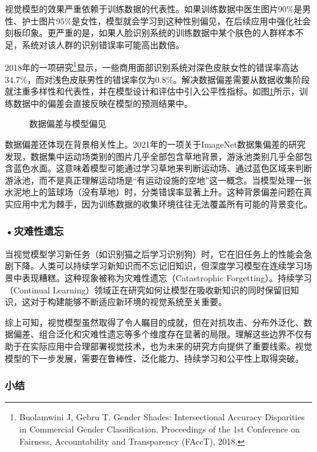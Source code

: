 视觉模型的效果严重依赖于训练数据的代表性。如果训练数据中医生图片90\%是男性、护士图片95\%是女性，模型就会学习到这种性别偏见，在后续应用中强化社会刻板印象。更严重的是，如果人脸识别系统的训练数据中某个肤色的人群样本不足，系统对该人群的识别错误率可能高出数倍。

2018年的一项研究\footnote{Buolamwini J, Gebru T. Gender Shades: Intersectional Accuracy Disparities in Commercial Gender Classification. Proceedings of the 1st Conference on Fairness, Accountability and Transparency (FAccT), 2018.}显示，一些商用面部识别系统对深色皮肤女性的错误率高达34.7\%，而对浅色皮肤男性的错误率仅为0.8\%。解决数据偏差需要从数据收集阶段就注重多样性和代表性，并在模型设计和评估中引入公平性指标。如图\ref{fig:ch2_2_21}所示，训练数据中的偏差会直接反映在模型的预测结果中。

\begin{figure}[H]
\centering
{}
\caption{数据偏差与模型偏见}
\label{fig:ch2_2_21}
\end{figure}

数据偏差还体现在背景相关性上。2021年的一项关于ImageNet数据集偏差的研究发现，数据集中运动场类别的图片几乎全部包含草地背景，游泳池类别几乎全部包含蓝色水面。这意味着模型可能通过学习草地来判断运动场、通过蓝色区域来判断游泳池，而不是真正理解运动场是“有运动设施的空地”这一概念。当模型处理一张水泥地上的篮球场（没有草地）时，分类错误率显著上升。这种背景偏差问题在真实应用中尤为棘手，因为训练数据的收集环境往往无法覆盖所有可能的背景变化。

\subsubsection*{\textbf{•灾难性遗忘}}

当视觉模型学习新任务（如识别猫之后学习识别狗）时，它在旧任务上的性能会急剧下降。人类可以持续学习新知识而不忘记旧知识，但深度学习模型在连续学习场景中表现糟糕。这种现象被称为灾难性遗忘（Catastrophic Forgetting）。持续学习（Continual Learning）领域正在研究如何让模型在吸收新知识的同时保留旧知识，这对于构建能够不断适应新环境的视觉系统至关重要。

综上可知，视觉模型虽然取得了令人瞩目的成就，但在对抗攻击、分布外泛化、数据偏差、组合泛化和灾难性遗忘等多个维度存在显著的局限。理解这些边界不仅有助于在实际应用中合理部署视觉技术，也为未来的研究方向提供了重要线索。视觉模型的下一步发展，需要在鲁棒性、泛化能力、持续学习和公平性上取得突破。


\subsubsection*{小结}

